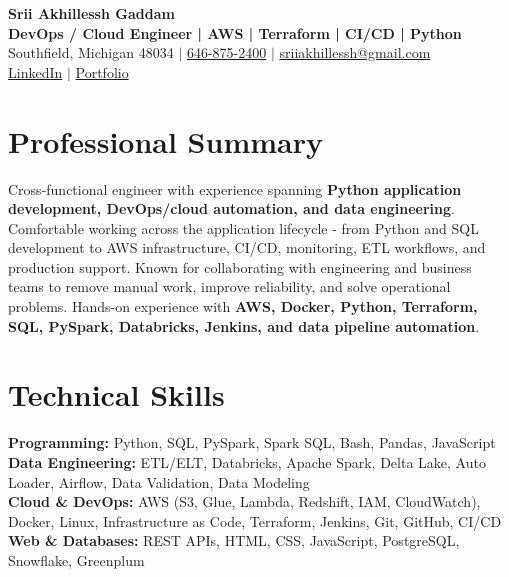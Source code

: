 \documentclass[letterpaper,10pt]{article}
\begin{document}
\fontsize{9.35pt}{10.45pt}\selectfont

\begin{center}
    {\LARGE \textbf{Srii Akhillessh Gaddam}} \\[-1pt]
    \textbf{DevOps / Cloud Engineer | AWS | Terraform | CI/CD | Python} \\[2pt]
    Southfield, Michigan 48034 $|$
    \href{tel:6468752400}{646-875-2400} $|$
    \href{mailto:sriiakhillessh@gmail.com}{sriiakhillessh@gmail.com} \\[1pt]
    \href{https://www.linkedin.com/in/srii-akhiilessh-gaddam-b48668191/}{LinkedIn} $|$
    \href{https://sriiakhillesshg.github.io/portfolio/}{Portfolio}
\end{center}
\vspace{-8pt}

\section{Professional Summary}
\small{Cross-functional engineer with experience spanning \textbf{Python application development, DevOps/cloud automation, and data engineering}. Comfortable working across the application lifecycle - from Python and SQL development to AWS infrastructure, CI/CD, monitoring, ETL workflows, and production support. Known for collaborating with engineering and business teams to remove manual work, improve reliability, and solve operational problems. Hands-on experience with \textbf{AWS, Docker, Python, Terraform, SQL, PySpark, Databricks, Jenkins, and data pipeline automation}.}

\section{Technical Skills}
\small{
\textbf{Programming:} Python, SQL, PySpark, Spark SQL, Bash, Pandas, JavaScript \\
\textbf{Data Engineering:} ETL/ELT, Databricks, Apache Spark, Delta Lake, Auto Loader, Airflow, Data Validation, Data Modeling \\
\textbf{Cloud \& DevOps:} AWS (S3, Glue, Lambda, Redshift, IAM, CloudWatch), Docker, Linux, Infrastructure as Code, Terraform, Jenkins, Git, GitHub, CI/CD \\
\textbf{Web \& Databases:} REST APIs, HTML, CSS, JavaScript, PostgreSQL, Snowflake, Greenplum
}
\end{document}
